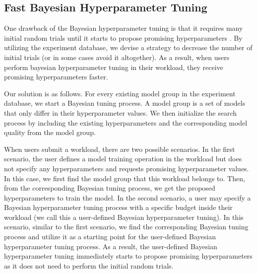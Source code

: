 \subsection{Fast Bayesian Hyperparameter Tuning}
One drawback of the Bayesian hyperparameter tuning is that it requires many initial random trials until it starts to propose promising hyperparameters \cite{hutter2011sequential,snoek2012practical}.
By utilizing the experiment database, we devise a strategy to decrease the number of initial trials (or in some cases avoid it altogether).
As a result, when users perform bayesian hyperparameter tuning in their workload, they receive promising hyperparameters faster.

Our solution is as follows.
For every existing model group in the experiment database, we start a Bayesian tuning process.
A model group is a set of models that only differ in their hyperparameter values.
We then initialize the search process by including the existing hyperparameters and the corresponding model quality from the model group.

When users submit a workload, there are two possible scenarios.
In the first scenario, the user defines a model training operation in the workload but does not specify any hyperparameters and requests promising hyperparameter values.
In this case, we first find the model group that this workload belongs to.
Then, from the corresponding Bayesian tuning process, we get the proposed hyperparameters to train the model.
In the second scenario, a user may specify a Bayesian hyperparameter tuning process with a specific budget inside their workload (we call this a user-defined Bayesian hyperparameter tuning).
In this scenario, similar to the first scenario, we find the corresponding Bayesian tuning process and utilize it as a starting point for the user-defined Bayesian hyperparameter tuning process.
As a result, the user-defined Bayesian hyperparameter tuning immediately starts to propose promising hyperparameters as it does not need to perform the initial random trials.


